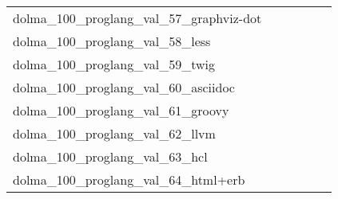 {\begin{longtable}{m{6cm}m{1.7cm}m{1.7cm}m{1.7cm}m{1.7cm}m{1.7cm}}
	dolma\_100\_proglang\_val\_57\_graphviz-dot  & \colorbox[HTML]{77c578}{\makebox[\mywidth][c]{2.17}} & \colorbox[HTML]{f3fab6}{\makebox[\mywidth][c]{2.48}} & \colorbox[HTML]{ffffe5}{\makebox[\mywidth][c]{3.54}} & \colorbox[HTML]{cae99c}{\makebox[\mywidth][c]{2.32}} & \colorbox[HTML]{bee496}{\makebox[\mywidth][c]{2.29}}\\
	dolma\_100\_proglang\_val\_58\_less  & \colorbox[HTML]{e3f4aa}{\makebox[\mywidth][c]{2.24}} & \colorbox[HTML]{fbfdd0}{\makebox[\mywidth][c]{2.26}} & \colorbox[HTML]{ffffe5}{\makebox[\mywidth][c]{2.33}} & \colorbox[HTML]{87cc7f}{\makebox[\mywidth][c]{2.22}} & \colorbox[HTML]{77c578}{\makebox[\mywidth][c]{2.22}}\\
	dolma\_100\_proglang\_val\_59\_twig  & \colorbox[HTML]{e1f3a9}{\makebox[\mywidth][c]{1.81}} & \colorbox[HTML]{e8f6ae}{\makebox[\mywidth][c]{1.81}} & \colorbox[HTML]{ffffe5}{\makebox[\mywidth][c]{1.91}} & \colorbox[HTML]{9fd688}{\makebox[\mywidth][c]{1.80}} & \colorbox[HTML]{77c578}{\makebox[\mywidth][c]{1.79}}\\
	dolma\_100\_proglang\_val\_60\_asciidoc  & \colorbox[HTML]{77c578}{\makebox[\mywidth][c]{5.33}} & \colorbox[HTML]{d1ec9f}{\makebox[\mywidth][c]{5.50}} & \colorbox[HTML]{ffffe5}{\makebox[\mywidth][c]{6.84}} & \colorbox[HTML]{b2df90}{\makebox[\mywidth][c]{5.43}} & \colorbox[HTML]{81c97c}{\makebox[\mywidth][c]{5.34}}\\
	dolma\_100\_proglang\_val\_61\_groovy  & \colorbox[HTML]{7fc97b}{\makebox[\mywidth][c]{2.12}} & \colorbox[HTML]{d8efa2}{\makebox[\mywidth][c]{2.15}} & \colorbox[HTML]{ffffe5}{\makebox[\mywidth][c]{2.41}} & \colorbox[HTML]{b4e091}{\makebox[\mywidth][c]{2.13}} & \colorbox[HTML]{77c578}{\makebox[\mywidth][c]{2.11}}\\
	dolma\_100\_proglang\_val\_62\_llvm  & \colorbox[HTML]{95d284}{\makebox[\mywidth][c]{2.26}} & \colorbox[HTML]{e6f5ad}{\makebox[\mywidth][c]{2.40}} & \colorbox[HTML]{ffffe5}{\makebox[\mywidth][c]{3.25}} & \colorbox[HTML]{bbe395}{\makebox[\mywidth][c]{2.31}} & \colorbox[HTML]{77c578}{\makebox[\mywidth][c]{2.23}}\\
	dolma\_100\_proglang\_val\_63\_hcl  & \colorbox[HTML]{bee496}{\makebox[\mywidth][c]{2.52}} & \colorbox[HTML]{e5f5ac}{\makebox[\mywidth][c]{2.56}} & \colorbox[HTML]{ffffe5}{\makebox[\mywidth][c]{2.96}} & \colorbox[HTML]{c3e698}{\makebox[\mywidth][c]{2.52}} & \colorbox[HTML]{77c578}{\makebox[\mywidth][c]{2.48}}\\
	dolma\_100\_proglang\_val\_64\_html+erb  & \colorbox[HTML]{eaf7af}{\makebox[\mywidth][c]{2.10}} & \colorbox[HTML]{e1f3a9}{\makebox[\mywidth][c]{2.09}} & \colorbox[HTML]{ffffe5}{\makebox[\mywidth][c]{2.23}} & \colorbox[HTML]{b3df91}{\makebox[\mywidth][c]{2.08}} & \colorbox[HTML]{77c578}{\makebox[\mywidth][c]{2.07}}\\

\end{longtable}}
